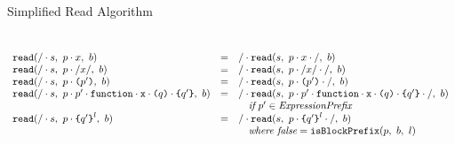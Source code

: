 \documentclass[preprint,10pt]{sigplanconf}
\begin{document}
\begin{displayfigure*}{\label{fig:simpleread}Simplified Read Algorithm}
\[\begin{array}{lcll}
    \\ \\

    \texttt{read}(/\cdot s,~p\cdot x,~b)
    &=&
    / \cdot 
      \texttt{read}(s,~
        p\cdot x\cdot /
      ,~b)
   
    \\
    \texttt{read}(/\cdot s,~p \cdot /x/,~b)
    &=&
    / \cdot 
      \texttt{read}(s,~
        p \cdot /x/ \cdot /
      ,~b)
   
    \\
    \texttt{read}(/\cdot s,~p \cdot \texttt{(}p'\texttt{)},~b)
    &=&
    / \cdot 
      \texttt{read}(s,~
        p \cdot \texttt{(}p'\texttt{)} \cdot /
      ,~b)
   
    \\
    \texttt{read}(/\cdot s,~
      p \cdot p' \cdot \texttt{function}\cdot \texttt{x} 
      \cdot \texttt{(}q\texttt{)} \cdot \texttt{\{}q'\texttt{\}}
    ,~b)
    &=&
    / \cdot 
      \texttt{read}(s,~
        p \cdot p' \cdot \texttt{function}\cdot \texttt{x} \cdot \texttt{(}q\texttt{)}
        \cdot \texttt{\{}q'\texttt{\}} \cdot /
      ,~b)
   
    \\
    && \quad \textit{if}~p' \in \textit{ExpressionPrefix}
    \\
    \texttt{read}(/\cdot s,~
      p \cdot \texttt{\{}q'\texttt{\}}^{l}
    ,~b)
    &=&
    / \cdot 
      \texttt{read}(s,~
        p \cdot \texttt{\{}q'\texttt{\}}^{l} \cdot /
      ,~b)
   
    \\
    && \quad \textit{where false} = \texttt{isBlockPrefix}(p,~b,~l)

    \\ \\
    


\end{array}\]
\end{displayfigure*}
\end{document}
